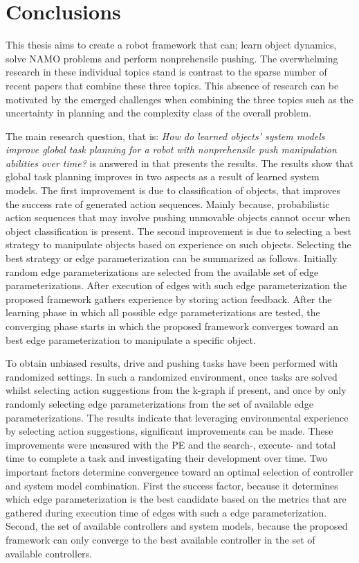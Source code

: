 \chapter{Conclusions}%
\label{chap:conclusion}
This thesis aims to create a robot framework that can; learn object dynamics, solve \ac{NAMO} problems and perform nonprehensile pushing. The overwhelming research in these individual topics stand is contrast to the sparse number of recent papers that combine these three topics. This absence of research can be motivated by the emerged challenges when combining the three topics such as the uncertainty in planning and the complexity class of the overall problem.\bs

The main research question, that is: \textit{How do learned objects' system models improve global task planning for a robot with nonprehensile push manipulation abilities over time?} is answered in  that presents the results. The results show that global task planning improves in two aspects as a result of learned system models. The first improvement is due to classification of objects, that improves the success rate of generated action sequences. Mainly because, probabilistic action sequences that may involve pushing unmovable objects cannot occur when object classification is present. The second improvement is due to selecting a best strategy to manipulate objects based on experience on such objects. Selecting the best strategy or edge parameterization can be summarized as follows. Initially random edge parameterizations are selected from the available set of edge parameterizations. After execution of edges with such edge parameterization the proposed framework gathers experience by storing action feedback. After the learning phase in which all possible edge parameterizations are tested, the converging phase starts in which the proposed framework converges toward an best edge parameterization to manipulate a specific object.\bs

To obtain unbiased results, drive and pushing tasks have been performed with randomized settings. In such a randomized environment, once tasks are solved whilst selecting action suggestions from the \ac{k-graph} if present, and once by only randomly selecting edge parameterizations from the set of available edge parameterizations. The results indicate that leveraging environmental experience by selecting action suggestions, significant improvements can be made. These improvements were measured with the \acl{PE} and the search-, execute- and total time to complete a task and investigating their development over time. Two important factors determine convergence toward an optimal selection of controller and system model combination. First the success factor, because it determines which edge parameterization is the best candidate based on the metrics that are gathered during execution time of edges with such a edge parameterization. Second, the set of available controllers and system models, because the proposed framework can only converge to the best available controller in the set of available controllers.\bs

